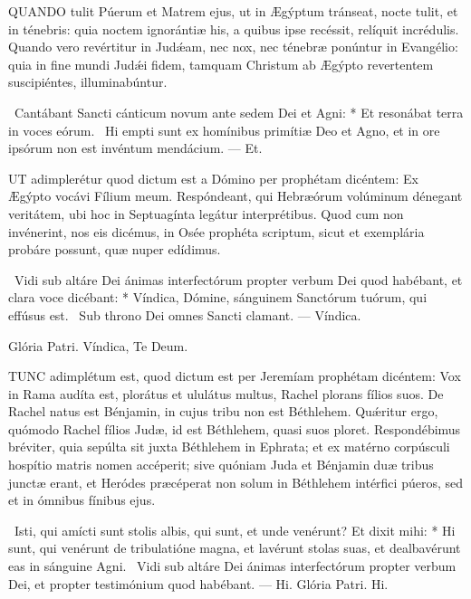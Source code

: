 
\lettrine[lines=2]{Q}{UANDO} tulit Púerum et Matrem ejus, ut in Ægýptum tránseat, nocte tulit, et in ténebris: quia noctem ignorántiæ his, a quibus ipse recéssit, relíquit incrédulis. Quando vero revértitur in Judǽam, nec nox, nec ténebræ ponúntur in Evangélio: quia in fine mundi Judǽi fidem, tamquam Christum ab Ægýpto revertentem suscipiéntes, illuminabúntur.

\R\ Cantábant Sancti cánticum novum ante sedem Dei et Agni: * Et resonábat terra in voces eórum. \V\ Hi empti sunt ex homínibus primítiæ Deo et Agno, et in ore ipsórum non est invéntum mendácium. --- Et.


\lettrine[lines=2]{U}{T} adimplerétur quod dictum est a Dómino per prophétam dicéntem: Ex Ægýpto vocávi Fílium meum. Respóndeant, qui Hebræórum volúminum dénegant veritátem, ubi hoc in Septuagínta legátur interprétibus. Quod cum non invénerint, nos eis dicémus, in Osée prophéta scriptum, sicut et exemplária probáre possunt, quæ nuper edídimus.

\R\ Vidi sub altáre Dei ánimas interfectórum propter verbum Dei quod habébant, et clara voce dicébant: * Víndica, Dómine, sánguinem Sanctórum tuórum, qui effúsus est. \V\ Sub throno Dei omnes Sancti clamant. --- Víndica.


Glória Patri. Víndica,  Te Deum. 


\lettrine[lines=2]{T}{UNC} adimplétum est, quod dictum est per Jeremíam prophétam dicéntem: Vox in Rama audíta est, plorátus et ululátus multus, Rachel plorans fílios suos. De Rachel natus est Bénjamin, in cujus tribu non est Béthlehem. Quǽritur ergo, quómodo Rachel fílios Judæ, id est Béthlehem, quasi suos ploret. Respondébimus bréviter, quia sepúlta sit juxta Béthlehem in Ephrata; et ex matérno corpúsculi hospítio matris nomen accéperit; sive quóniam Juda et Bénjamin duæ tribus junctæ erant, et Heródes præcéperat non solum in Béthlehem intérfici púeros, sed et in ómnibus fínibus ejus.

\R\ Isti, qui amícti sunt stolis albis, qui sunt, et unde venérunt? Et dixit mihi: * Hi sunt, qui venérunt de tribulatióne magna, et lavérunt stolas suas, et dealbavérunt eas in sánguine Agni. \V\ Vidi sub altáre Dei ánimas interfectórum propter verbum Dei, et propter testimónium quod habébant. --- Hi. Glória Patri. Hi.

